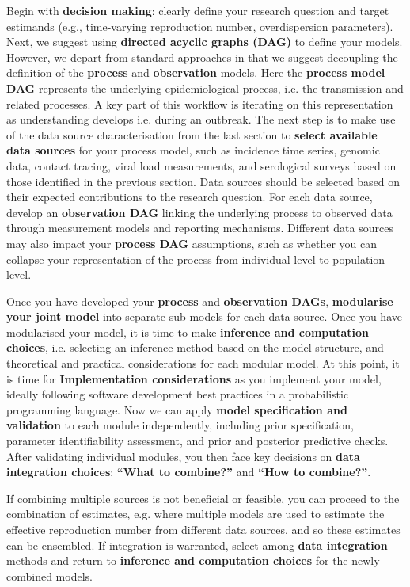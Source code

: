 \documentclass{article}
\begin{document}
Begin with \textbf{decision making}: clearly define your research question and target estimands (e.g., time-varying reproduction number, overdispersion parameters).
Next, we suggest using \textbf{directed acyclic graphs (DAG)}  to define your models. However, we depart from standard approaches in that we suggest decoupling the definition of the \textbf{process} and \textbf{observation} models.
Here the \textbf{process model DAG} represents the underlying epidemiological process, i.e. the transmission and related processes.
A key part of this workflow is iterating on this representation as understanding develops i.e. during an outbreak.
The next step is to make use of the data source characterisation from the last section to \textbf{select available data sources} for your process model, such as incidence time series, genomic data, contact tracing, viral load measurements, and serological surveys based on those identified in the previous section.
Data sources should be selected based on their expected contributions to the research question.
For each data source, develop an \textbf{observation DAG} linking the underlying process to observed data through measurement models and reporting mechanisms.
Different data sources may also impact your \textbf{process DAG} assumptions, such as whether you can collapse your representation of the process from individual-level to population-level.

Once you have developed your \textbf{process} and \textbf{observation DAGs}, \textbf{modularise your joint model} into separate sub-models for each data source.
Once you have modularised your model, it is time to make \textbf{inference and computation choices}, i.e. selecting an inference method based on the model structure, and theoretical and practical considerations for each modular model.
At this point, it is time for \textbf{Implementation considerations} as you implement your model, ideally following software development best practices in a probabilistic programming language.
Now we can apply \textbf{model specification and validation} to each module independently, including prior specification, parameter identifiability assessment, and prior and posterior predictive checks.
After validating individual modules, you then face key decisions on \textbf{data integration choices}: \textbf{``What to combine?''} and \textbf{``How to combine?''}.

If combining multiple sources is not beneficial or feasible, you can proceed to the combination of estimates, e.g. where multiple models are used to estimate the effective reproduction number from different data sources, and so these estimates can be ensembled.
If integration is warranted, select among \textbf{data integration} methods and return to \textbf{inference and computation choices} for the newly combined models.
\end{document}
